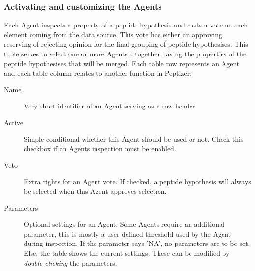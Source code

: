 %
%
\subsubsection{\label{agentpanel}Activating and customizing the Agents}
\npar Each Agent inspects a property of a peptide hypothesis and casts a vote on each element coming from the data source. This vote has either an approving, reserving of rejecting opinion for the final grouping of peptide hypothesises. This table serves to select one or more Agents altogether having the properties of the peptide hypothesises that will be merged.
\npar Each table row represents an Agent and each table column relates to another function in Peptizer:
\begin{description}
	\item[Name] Very short identifier of an Agent serving as a row header.
	\item[Active] Simple conditional whether this Agent should be used or not. Check this checkbox if an Agents inspection must be enabled. 
	\item[Veto] Extra rights for an Agent vote. If checked, a peptide hypothesis will always be selected when this Agent approves selection. 
	\item[Parameters] Optional settings for an Agent. Some Agents require an additional parameter, this is mostly a user-defined threshold used by the Agent during inspection. If the parameter says 'NA', no parameters are to be set. Else, the table shows the current settings. These can be modified by \textit{double-clicking} the parameters.
\end{description}
%
\begin{center}
\end{center}
%
%
